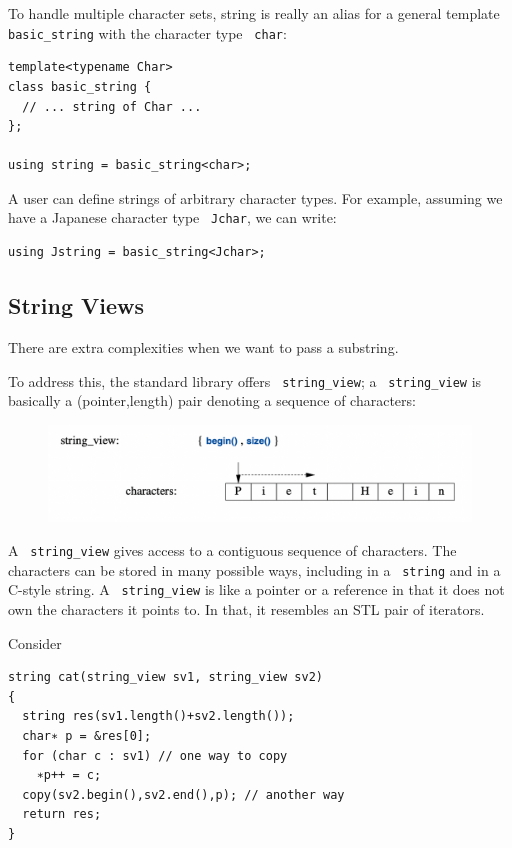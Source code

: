 \documentclass[11pt]{article}
\let\OldTexttt\texttt
\renewcommand{\texttt}[1]{\OldTexttt{\color{MidnightBlue} #1}}
\begin{document}
To handle multiple character sets, string is really an alias for a general template \texttt{basic\_string}
with the character type \texttt{char}:
\begin{verbatim}
template<typename Char>
class basic_string {
  // ... string of Char ...
};

using string = basic_string<char>;
\end{verbatim}

A user can define strings of arbitrary character types. For example, assuming we have a Japanese
character type \texttt{Jchar}, we can write:
\begin{verbatim}
using Jstring = basic_string<Jchar>;
\end{verbatim}
\subsection{String Views}
\label{sec:org986a29d}
There are extra complexities when we want to pass a substring.

To address this, the standard library offers \texttt{string\_view}; a \texttt{string\_view} is basically a
(pointer,length) pair denoting a sequence of characters:

\begin{figure}[htbp]
\centering
\includegraphics[width=.8\textwidth]{../images/ATourOfC++/5.png}
\label{}
\end{figure}

A \texttt{string\_view} gives access to a contiguous sequence of characters. The characters can be stored
in many possible ways, including in a \texttt{string} and in a C-style string. A \texttt{string\_view} is like a
pointer or a reference in that it does not own the characters it points to. In that, it
resembles an STL pair of iterators.

Consider
\begin{verbatim}
string cat(string_view sv1, string_view sv2)
{
  string res(sv1.length()+sv2.length());
  char∗ p = &res[0];
  for (char c : sv1) // one way to copy
    ∗p++ = c;
  copy(sv2.begin(),sv2.end(),p); // another way
  return res;
}
\end{verbatim}
\end{document}
